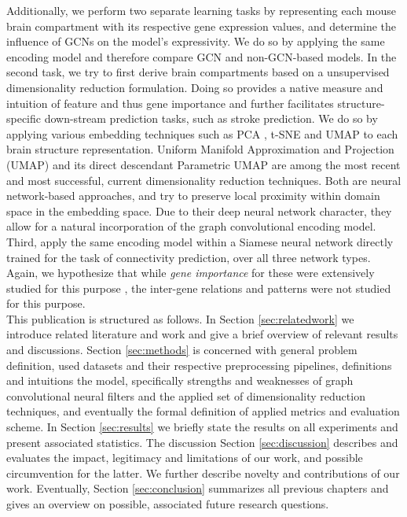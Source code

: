 \documentclass[]{article}
\renewcommand{\cite}{\citep}
\begin{document}
Additionally, we perform two separate learning tasks by representing each mouse brain compartment with its respective gene expression values, and determine the influence of GCNs on the model's expressivity. We do so by applying the same encoding model and therefore compare GCN and non-GCN-based models.
In the second task, we try to first derive brain compartments based on a unsupervised dimensionality reduction formulation. Doing so provides a native measure and intuition of feature and thus gene importance and further facilitates structure-specific down-stream prediction tasks, such as stroke prediction.
We do so by applying various embedding techniques such as PCA \cite{wold1987principal}, t-SNE \cite{van2008visualizing} and UMAP  \cite{mcinnes2018umap} to each brain structure representation. Uniform Manifold Approximation and Projection (UMAP) and its direct descendant Parametric UMAP \cite{sainburg2021parametric} are among the most recent and most successful, current dimensionality reduction techniques. Both are neural network-based approaches, and try to preserve local proximity within domain space in the embedding space. Due to their deep neural network character, they allow for a natural incorporation of the graph convolutional encoding model. 
Third, apply the same encoding model within a Siamese neural network directly trained for the task of connectivity prediction, over all three network types. Again, we hypothesize that while \textit{gene importance} for these were extensively studied for this purpose \cite{bohland2010clustering, ValkShapingBrainStructure2020, takata_flexible_2021, friston2011functional}, the inter-gene relations and patterns were not studied for this purpose.\\

This publication is structured as follows. In Section \ref{sec:relatedwork} we introduce related literature and work and give a brief overview of relevant results and discussions. Section \ref{sec:methods} is concerned with general problem definition, used datasets and their respective preprocessing pipelines, definitions and intuitions the model, specifically strengths and weaknesses of graph convolutional neural filters and the applied set of dimensionality reduction techniques, and eventually the formal definition of applied metrics and evaluation scheme.
In Section \ref{sec:results} we briefly state the results on all experiments and present associated statistics. The discussion Section \ref{sec:discussion} describes and evaluates the impact, legitimacy and limitations of our work, and possible circumvention for the latter. We further describe novelty and contributions of our work. Eventually, Section \ref{sec:conclusion} summarizes all previous chapters and gives an overview on possible, associated future research questions.\\
\end{document}
